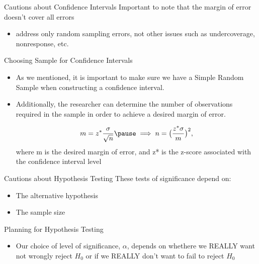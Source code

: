 \documentclass{beamer}
\begin{document}
\begin{frame}{Cautions about Confidence Intervals}
	Important to note that the \alert{margin of error} doesn't cover all errors
	\begin{itemize}
		\item address only random sampling errors, not other issues such as undercoverage, nonresponse, etc.
	\end{itemize}
\end{frame}

\begin{frame}{Choosing Sample for Confidence Intervals}
	
	\begin{itemize}
		\item As we mentioned, it is important to make sure we have a Simple Random Sample when constructing a confidence interval. 
		
		\item Additionally, the researcher can determine the number of observations required in the sample in order to achieve a desired margin of error. 
		
		\[
			m = z^* \frac{\sigma}{\sqrt{n}} \pause \implies n=\big(\frac{z^*\sigma}{m}\big)^2,
		\]
		where m is the desired margin of error, and z* is the z-score associated with the confidence interval level
	\end{itemize}
\end{frame}


\begin{frame}{Cautions about Hypothesis Testing}
	These tests of significance depend on: 

	\begin{itemize}
		\item The alternative hypothesis
		\item The sample size
	\end{itemize}
\end{frame}

\begin{frame}{Planning for Hypothesis Testing}
	\begin{itemize}
		\item Our choice of level of significance, $\alpha$, depends on whethere we REALLY want not wrongly reject $H_0$ or if we REALLY don't want to fail to reject $H_0$
	\end{itemize}
\end{frame}
\end{document}

